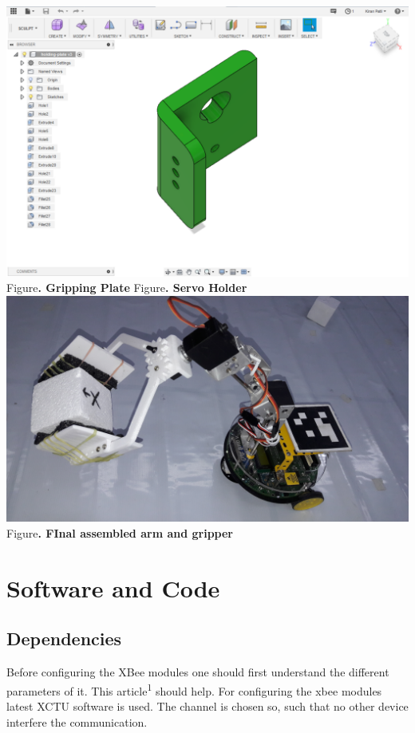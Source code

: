 \documentclass[a4paper,12pt,oneside]{book}
\begin{document}
\begin{center}
\includegraphics[scale=0.2]{HoldingPlate.png}\\
\small{Figure\textbf{. Gripping Plate} \hspace{5 em}Figure\textbf{. Servo Holder}}\\
\includegraphics[scale=0.07]{final.jpg}\\
\small{Figure\textbf{. FInal assembled arm and gripper}}
\end{center}
\section{Software and Code}
\subsection*{Dependencies}
Before configuring the XBee modules one should first understand the different parameters of it. This article\textsuperscript{1} should help.  For configuring the xbee modules latest XCTU software is used. The channel is chosen so, such that no other device interfere the communication. 
\end{document}
